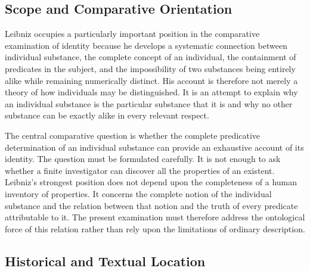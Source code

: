 
\subsection*{Scope and Comparative Orientation}

\label{para:VS.B01.P01.C08.S07.SS01.P001}

Leibniz occupies a particularly important position in the
comparative examination of identity because he develops
a systematic connection between individual substance,
the complete concept of an individual, the containment
of predicates in the subject, and the impossibility of
two substances being entirely alike while remaining
numerically distinct. His account is therefore not
merely a theory of how individuals may be distinguished.
It is an attempt to explain why an individual substance
is the particular substance that it is and why no other
substance can be exactly alike in every relevant respect.

\label{para:VS.B01.P01.C08.S07.SS01.P002}

The central comparative question is whether the complete
predicative determination of an individual substance
can provide an exhaustive account of its identity.
The question must be formulated carefully. It is not
enough to ask whether a finite investigator can discover
all the properties of an existent. Leibniz's strongest
position does not depend upon the completeness of a
human inventory of properties. It concerns the complete
notion of the individual substance and the relation
between that notion and the truth of every predicate
attributable to it. The present examination must therefore
address the ontological force of this relation rather
than rely upon the limitations of ordinary description.



\subsection{Historical and Textual Location}
\label{subsec:ch08-leibniz-historical}

